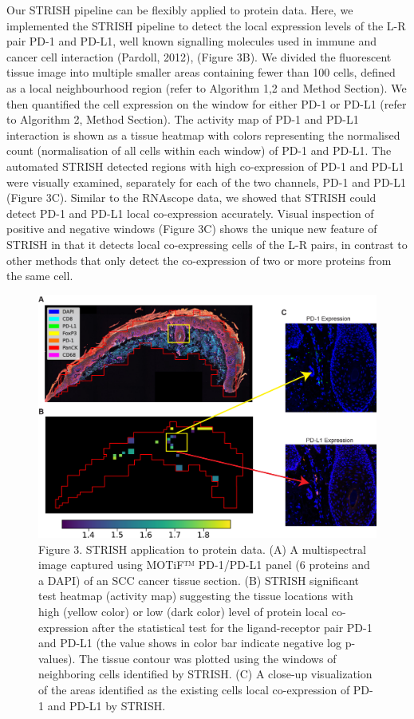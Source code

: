 Our STRISH pipeline can be flexibly applied to protein data. Here, we implemented the STRISH pipeline to detect the local expression levels of the L-R pair PD-1 and PD-L1, well known signalling molecules used in immune and cancer cell interaction (Pardoll, 2012), (Figure 3B). We divided the fluorescent tissue image into multiple smaller areas containing fewer than 100 cells, defined as a local neighbourhood region (refer to Algorithm 1,2 and Method Section). We then quantified the cell expression on the window for either PD-1 or PD-L1 (refer to Algorithm 2, Method Section). The activity map of PD-1 and PD-L1 interaction is shown as a tissue heatmap with colors representing the normalised count (normalisation of all cells within each window) of PD-1 and PD-L1. The automated STRISH detected regions with high co-expression of PD-1 and PD-L1 were visually examined, separately for each of the two channels, PD-1 and PD-L1 (Figure 3C). Similar to the RNAscope data, we showed that STRISH could detect PD-1 and PD-L1 local co-expression accurately. Visual inspection of positive and negative windows (Figure 3C) shows the unique new feature of STRISH in that it detects local co-expressing cells of the L-R pairs, in contrast to other methods that only detect the co-expression of two or more proteins from the same cell. 
\begin{figure}[htp]
    \centering
    \includegraphics[width=0.8\columnwidth]{Chapter2/Figures/Chapter2_Fig3.jpg}
    \caption{Figure 3. STRISH application to protein data. (A) A multispectral image captured using MOTiF™ PD-1/PD-L1 panel (6 proteins and a DAPI) of an SCC cancer tissue section. (B) STRISH significant test heatmap (activity map) suggesting the tissue locations with high (yellow color) or low (dark color) level of protein local co-expression after the statistical test for the ligand-receptor pair PD-1 and PD-L1 (the value shows in color bar indicate negative log p-values). The tissue contour was plotted using the windows of neighboring cells identified by STRISH. (C) A close-up visualization of the areas identified as the existing cells local co-expression of PD-1 and PD-L1 by STRISH.  }
    \label{fig:Chap2_figure3}
\end{figure}
